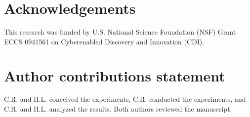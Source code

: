 \documentclass{article}
\begin{document}




%

\section*{Acknowledgements}


This research was funded by U.S. National Science Foundation (NSF) Grant ECCS 0941561 on
Cyberenabled Discovery and Innovation (CDI).

\section*{Author contributions statement}


C.R. and H.L. conceived the experiments, C.R. conducted the experiments, and C.R. and H.L. analyzed
the results. Both authors reviewed the manuscript.
\end{document}
